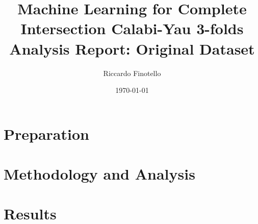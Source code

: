 \documentclass[10pt,a4paper]{article}
\author{Riccardo Finotello}
\title{
    Machine Learning for Complete Intersection Calabi-Yau 3-folds
    \\[0.3cm]
    \Large{\textbf{Analysis Report: Original Dataset}}
}
\date{\today}
\numberwithin{equation}{section}
\numberwithin{figure}{section}
\numberwithin{table}{section}
\begin{document}
    \maketitle
    
    \begin{abstract}
        
    \end{abstract}
    
    \tableofcontents
    
    \section{Preparation}
        
    
    \section{Methodology and Analysis}
        
    
    \section{Results}
        
    
    
    
\end{document}
